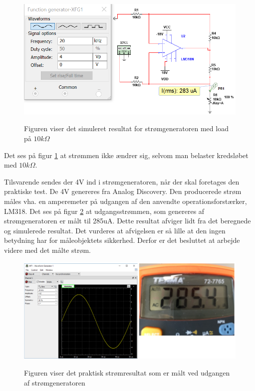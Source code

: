 \begin{figure}[H] 
\centering
{\includegraphics[width=\linewidth]
{Figure/SimuleretStromMedLoad}}
\caption{Figuren viser det simuleret resultat for  strømgeneratoren med load på $10k\Omega$}
\label{SimTestStromNoLoad}
\end{figure}

Det ses på figur \ref{SimTestStromNoLoad} at strømmen ikke ændrer sig, selvom man belaster kredsløbet med $ 10k\Omega	$.   



\pagebreak
Tilsvarende sendes der 4V ind i strømgeneratoren, når der skal foretages den praktiske test. De 4V genereres fra Analog Discovery. Den producerede strøm måles vha. 
en amperemeter på udgangen af den anvendte operationsforstærker, LM318. Det ses på figur \ref{TestStrGen} at udgangsstrømmen, som genereres af strømgeneratoren er målt til 285uA. Dette resultat afviger lidt fra det beregnede og simulerede resultat. Det vurderes at afvigelsen er så lille at den ingen betydning har for måleobjektets sikkerhed. Derfor er det besluttet at arbejde videre med det målte strøm. 


\begin{figure}[H] 
\centering
{\includegraphics[width=\linewidth]
{Figure/VCCStestParktisk}}
\caption{Figuren viser det praktisk strømresultat som er målt ved udgangen af strømgeneratoren}
\label{TestStrGen}
\end{figure}


